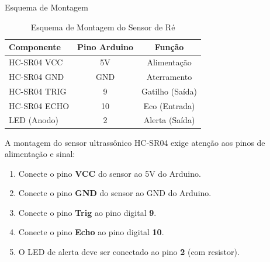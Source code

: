 \documentclass[lang=pt,11pt]{elegantbook}
\begin{document}
Esquema de Montagem
\begin{table}[htbp]
	\centering
    \caption{Esquema de Montagem do Sensor de Ré}
	\begin{tabular}{lcc}
	\toprule
	\textbf{Componente} & \textbf{Pino Arduino} & \textbf{Função} \\ 
    \midrule
	HC-SR04 VCC & 5V & Alimentação \\ 
	HC-SR04 GND & GND & Aterramento \\ 
	HC-SR04 TRIG & 9 & Gatilho (Saída) \\ 
	HC-SR04 ECHO & 10 & Eco (Entrada) \\ 
	LED (Anodo) & 2 & Alerta (Saída) \\ 
    \bottomrule
	\end{tabular}
\end{table}

A montagem do sensor ultrassônico HC-SR04 exige atenção aos pinos de alimentação e sinal:
\begin{enumerate}
    \item Conecte o pino \textbf{VCC} do sensor ao 5V do Arduino.
    \item Conecte o pino \textbf{GND} do sensor ao GND do Arduino.
    \item Conecte o pino \textbf{Trig} ao pino digital \textbf{9}.
    \item Conecte o pino \textbf{Echo} ao pino digital \textbf{10}.
    \item O LED de alerta deve ser conectado ao pino \textbf{2} (com resistor).
\end{enumerate}
\end{document}
